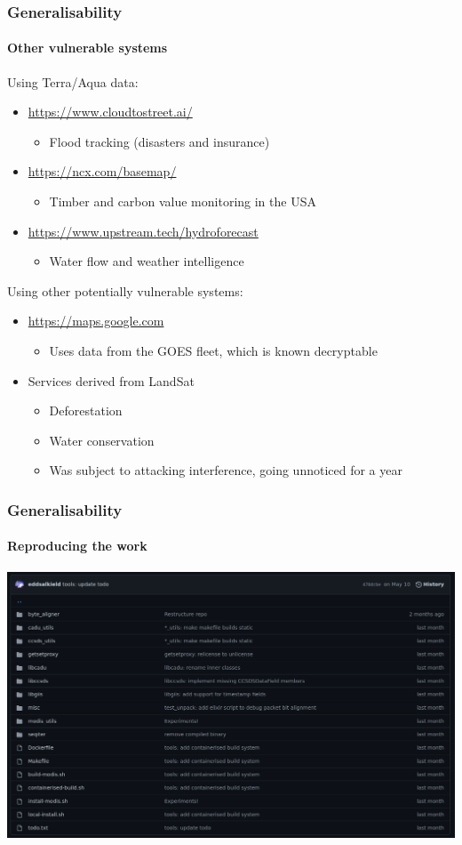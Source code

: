 \documentclass{beamer}
\begin{document}
\begin{frame}
  \frametitle{Generalisability}
  \framesubtitle{Other vulnerable systems}
  Using Terra/Aqua data:
  \begin{itemize}
    \item \url{https://www.cloudtostreet.ai/}
      \begin{itemize}
        \item Flood tracking (disasters and insurance)
      \end{itemize}
    \item \url{https://ncx.com/basemap/}
      \begin{itemize}
        \item Timber and carbon value monitoring in the USA
      \end{itemize}
    \item \url{https://www.upstream.tech/hydroforecast}
      \begin{itemize}
        \item Water flow and weather intelligence
      \end{itemize}
  \end{itemize}

  Using other potentially vulnerable systems:
  \begin{itemize}
    \item \url{https://maps.google.com}
      \begin{itemize}
        \item Uses data from the GOES fleet, which is known decryptable
      \end{itemize}
    \item Services derived from LandSat
      \begin{itemize}
        \item Deforestation
        \item Water conservation
        \item Was subject to attacking interference, going unnoticed for a year
      \end{itemize}
  \end{itemize}

\end{frame}

\begin{frame}
  \frametitle{Generalisability}
  \framesubtitle{Reproducing the work}
  \includegraphics[width=\textwidth]{images/code_overview.png}
\end{frame}
\end{document}
